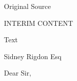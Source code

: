 			
			\begin{description}
				\item[Original Source]
			\end{description}
			
				INTERIM CONTENT
			
			
			\begin{description}
				\item[Text]
			\end{description}
			

				Sidney Rigdon Esq

				Dear Sir,

